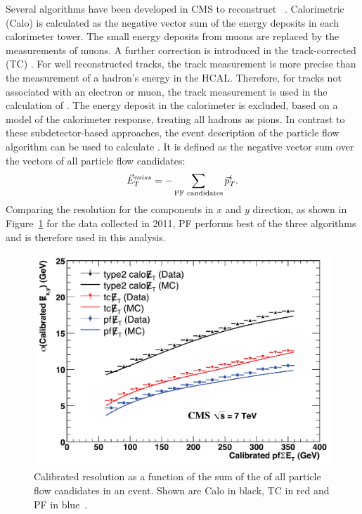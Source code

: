 Several algorithms have been developed in CMS to reconstruct \MET~\cite{7TeVMETPaper}. Calorimetric (Calo) \METVec is calculated as the negative vector sum of the energy deposits in each calorimeter tower. The small energy deposits from muons are replaced by the \pt measurements of muons. A further correction is introduced in the track-corrected (TC) \METVec. For well reconstructed tracks, the track measurement is more precise than the measurement of a hadron's energy in the HCAL. Therefore, for tracks not associated with an electron or  muon, the track measurement is used in the calculation of \METVec. The energy deposit in the calorimeter is excluded, based on a model of the calorimeter response, treating all hadrons as pions. In contrast to these subdetector-based approaches, the event description of the particle flow algorithm can be used to calculate \METVec. It is defined as the negative vector sum over the \pt vectors of all particle flow candidates:
\begin{equation}
 \vec{E}_{T}^{miss} = - \sum\limits_{\text{PF candidates}} \vec{p}_T^i.
\end{equation}
Comparing the resolution for the \MET components in $x$ and $y$ direction, as shown in Figure~\ref{fig:METReso} for the data collected in 2011, PF \MET performs best of the three algorithms and is therefore used in this analysis.
\begin{figure}
\begin{center}
\includegraphics[scale=0.2]{plots/RECO/METResolution.png}
\caption{Calibrated \MET resolution as a function of the sum of the \Et of all particle flow candidates in an event. Shown are Calo \MET in black, TC \MET in red and PF \MET in blue~\cite{7TeVMETPaper}.}
\label{fig:METReso}
\end{center}
\end{figure}

